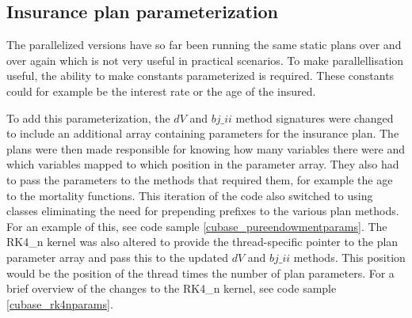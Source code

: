 \begin{table}[h!]
\centering
{}
\caption{F\# Alea.cuBase calculations per ms with double precision\label{table:cubaseManualdoubletime}}
\end{table}

\subsection{Insurance plan parameterization}\label{sub:manual_parameterization}
The parallelized versions have so far been running the same static plans over and over again which is not very useful in practical scenarios.
To make parallellisation useful, the ability to make constants parameterized is required.
These constants could for example be the interest rate or the age of the insured.

To add this parameterization, the $dV$ and $bj\_ii$ method signatures were changed to include an additional array containing parameters for the insurance plan.
The plans were then made responsible for knowing how many variables there were and which variables mapped to which position in the parameter array. 
They also had to pass the parameters to the methods that required them, for example the age to the mortality functions.
This iteration of the code also switched to using classes eliminating the need for prepending prefixes to the various plan methods.
For an example of this, see code sample \ref{cubase_pureendowmentparams}.
The RK4\_n kernel was also altered to provide the thread-specific pointer to the plan parameter array and pass this to the updated $dV$ and $bj\_ii$ methods.
This position would be the position of the thread times the number of plan parameters.
For a brief overview of the changes to the RK4\_n kernel, see code sample \ref{cubase_rk4nparams}.

